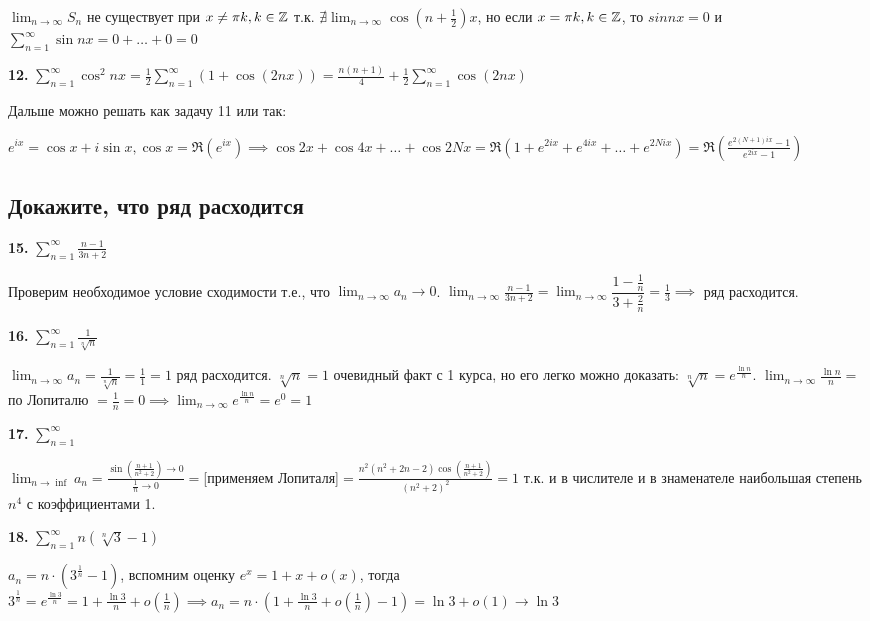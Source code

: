 $\lim_{n \to \infty} S_n$ не существует при $x \neq \pi k, k \in \mathbb{Z}$ т.к. $\nexists \lim_{n \to \infty} \cos (n + \frac{1}{2})x$, но если $x = \pi k, k \in \mathbb{Z}$, то $sin nx = 0$ и $\sum_{n=1}^{\infty} \sin nx = 0 + \dots + 0 = 0$

\textbf{12.} $\sum_{n=1}^{\infty} \cos^2 nx = \frac{1}{2} \sum_{n=1}^{\infty} (1 + \cos{(2nx)}) = \frac{n(n+1)}{4} + \frac{1}{2} \sum_{n=1}^{\infty} \cos{(2nx)}$

Дальше можно решать как задачу 11 или так:

$e^{ix} = \cos x + i\sin x, \cos x = \Re(e^{ix}) \implies \cos 2x + \cos 4x + \dots + \cos 2Nx = \Re(1 + e^{2ix} + e^{4ix} + \dots + e^{2Nix}) = \Re\left(\frac{e^{2(N+1)ix} - 1}{e^{2ix} - 1}\right)$

\subsection{Докажите, что ряд расходится}

\textbf{15.} $\sum_{n=1}^{\infty} \frac{n-1}{3n+2}$

Проверим необходимое условие сходимости т.е., что $\lim_{n \to \infty} a_n \to 0$. $\lim_{n \to \infty} \frac{n-1}{3n+2} = \lim_{n \to \infty} \dfrac{1-\frac{1}{n}}{3+\frac{2}{n}} = \frac{1}{3} \implies$ ряд расходится.

\textbf{16.} $\sum_{n=1}^{\infty} \frac{1}{\sqrt[n]{n}}$

$\lim_{n \to \infty} a_n = \frac{1}{\sqrt[n]{n}} = \frac{1}{1} = 1$ ряд расходится. $\sqrt[n]{n} = 1$ очевидный факт с 1 курса, но его легко можно доказать: $ \sqrt[n]{n} = e^{\frac{\ln n}{n}}$. $\lim_{n \to \infty} \frac{\ln n}{n}=$ по Лопиталю $= \frac{1}{n} = 0 \implies \lim_{n \to \infty} e^{\frac{\ln n}{n}} = e^0 = 1$

\textbf{17.} $\sum_{n=1}^{\infty}$

$\lim_{n \to \inf} a_n = \frac{\sin{(\frac{n+1}{n^2+2})} \to 0}{\frac{1}{n} \to 0} =$[применяем Лопиталя]$= \frac{n^2(n^2+2n-2) \cos{(\frac{n+1}{n^2+2})}}{(n^2+2)^2} = 1$ т.к. и в числителе и в знаменателе наибольшая степень $n^4$ с коэффициентами 1.

\textbf{18.} $\sum_{n=1}^{\infty} n (\sqrt[n]{3} - 1)$

$a_n = n \cdot (3^{\frac{1}{n}} - 1)$, вспомним оценку $e^x = 1 + x + o(x)$, тогда $3^{\frac{1}{n}} = e^{\frac{\ln 3}{n}} = 1 + \frac{\ln 3}{n} + o(\frac{1}{n}) \implies a_n = n\cdot (1 + \frac{\ln 3}{n} + o(\frac{1}{n}) - 1) = \ln 3 + o(1) \to \ln 3$

